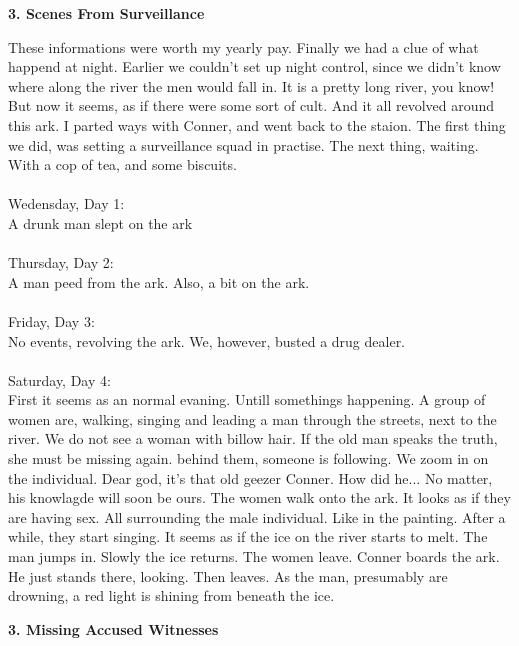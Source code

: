 \documentclass[]{article}
\begin{document}
\newpage 

\begin{center}
	\large\textbf{3. Scenes From Surveillance}
\end{center}
 
These informations were worth my yearly pay. Finally we had a clue of what happend at night. Earlier we couldn't set up night control, since we didn't know where along the river the men would fall in. It is a pretty long river, you know! But now it seems, as if there were some sort of cult. And it all revolved around this ark. I parted ways with Conner, and went back to the staion. The first thing we did, was setting a surveillance squad in practise. The next thing, waiting. With a cop of tea, and some biscuits.
\\ \\
Wedensday, Day 1: 
\\
A drunk man slept on the ark
\\ \\
Thursday, Day 2: 
\\
A man peed from the ark. Also, a bit on the ark.
\\ \\
Friday, Day  3: 
\\
No events, revolving the ark. We, however, busted a drug dealer.
\\ \\
Saturday, Day 4:
\\
First it seems as an normal evaning. Untill somethings happening. A group of women are, walking, singing and leading a man through the streets, next to the river. We do not see a woman with billow hair. If the old man speaks the truth, she must be missing again. behind them, someone is following. We zoom in on the individual. Dear god, it's that old geezer Conner. How did he... No matter, his knowlagde will soon be ours. The women walk onto the ark. It looks as if they are having sex. All surrounding the male individual. Like in the painting. After a while, they start singing. It seems as if the ice on the river starts to melt. The man jumps in. Slowly the ice returns. The women leave. Conner boards the ark. He just stands there, looking. Then leaves. As the man, presumably are drowning, a red light is shining from beneath the ice. 

\newpage

\begin{center}
	\large\textbf{3. Missing Accused Witnesses}
\end{center}
\end{document}
